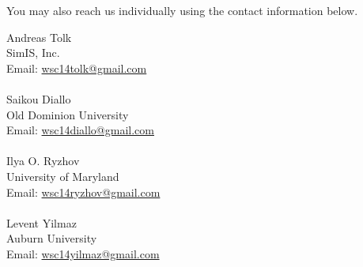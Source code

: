 \documentclass{wscposterproc}
\begin{document}
You may also reach us individually using the contact information below.

\vspace{6pt}

\noindent Andreas Tolk\\
SimIS, Inc.\\
Email: \href{mailto://wsc14tolk@gmail.com}{wsc14tolk@gmail.com}\\
\\
Saikou Diallo\\
Old Dominion University\\
Email: \href{mailto://wsc14diallo@gmail.com}{wsc14diallo@gmail.com}\\
\\
Ilya O. Ryzhov\\
University of Maryland\\
Email: \href{mailto://wsc14ryzhov@gmail.com}{wsc14ryzhov@gmail.com}\\
\\
Levent Yilmaz\\
Auburn University\\
Email: \href{mailto://wsc14yilmaz@gmail.com}{wsc14yilmaz@gmail.com}\\
\\


\end{document}
